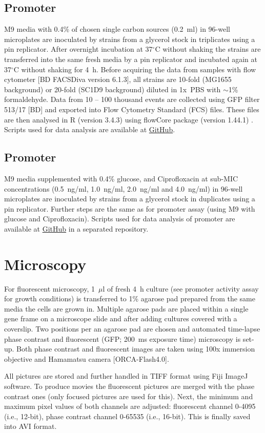 \subsection{Promoter }
M9 media with 0.4\% of chosen single carbon sources (0.2~ml) in 96-well microplates are inoculated by strains from a glycerol stock in triplicates using a pin replicator.
After overnight incubation at 37$^{\circ}$C without shaking the strains are transferred into the same fresh media by a pin replicator and incubated again at 37$^{\circ}$C without shaking for 4~h.
Before acquiring the data from samples with flow cytometer [BD FACSDiva version 6.1.3], all strains are 10-fold (MG1655 background) or 20-fold (SC1\textunderscore D9 background) diluted in 1x~PBS with $\sim$1\% formaldehyde.
Data from 10 -- 100 thousand events are collected using GFP filter 513/17 [BD] and exported into Flow Cytometry Standard (FCS) files.
These files are then analysed in R (version 3.4.3) using flowCore package (version 1.44.1) \cite{hahne2009flowcore}.
Scripts used for data analysis are available at \href{https://github.com/marketavlkova/LacZ_FC}{GitHub}.

\subsection{Promoter }
M9 media supplemented with 0.4\% glucose, and Ciprofloxacin at sub-MIC concentrations (0.5~ng/ml, 1.0~ng/ml, 2.0~ng/ml and 4.0~ng/ml) in 96-well microplates are inoculated by strains from a glycerol stock in duplicates using a pin replicator.
Further steps are the same as for  promoter assay (using M9 with glucose and Ciprofloxacin).
Scripts used for data analysis of  promoter are available at \href{https://github.com/marketavlkova/RecA}{GitHub} in a separated repository.


\section{Microscopy}
For fluorescent microscopy, 1~$\mu$l of fresh 4~h culture (see promoter activity assay for growth conditions) is transferred to 1\% agarose pad prepared from the same media the cells are grown in.
Multiple agarose pads are placed within a single gene frame on a microscope slide and after adding cultures covered with a coverslip.
Two positions per an agarose pad are chosen and automated time-lapse phase contrast and fluorescent (GFP; 200~ms exposure time) microscopy is set-up.
Both phase contrast and fluorescent images are taken using 100x immersion objective and Hamamatsu camera [ORCA-Flash4.0].

All pictures are stored and further handled in TIFF format using Fiji ImageJ software.
To produce movies the fluorescent pictures are merged with the phase contrast ones (only focused pictures are used for this).
Next, the minimum and maximum pixel values of both channels are adjusted: fluorescent channel 0-4095 (i.e., 12-bit), phase contrast channel 0-65535 (i.e., 16-bit).
This is finally saved into AVI format.

\cleardoublepage%

\shorthandon{-}
